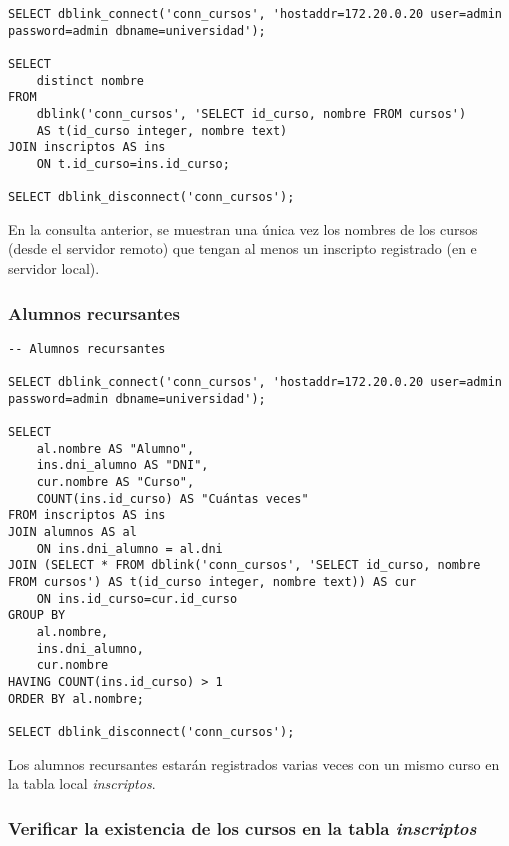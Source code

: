 \vspace*{5mm}
\begin{lstlisting}[title=Cursos con algún inscripto (el script es \emph{cursos\_con\_inscriptos.sql})]
SELECT dblink_connect('conn_cursos', 'hostaddr=172.20.0.20 user=admin password=admin dbname=universidad');

SELECT 
    distinct nombre 
FROM 
    dblink('conn_cursos', 'SELECT id_curso, nombre FROM cursos') 
    AS t(id_curso integer, nombre text)
JOIN inscriptos AS ins 
    ON t.id_curso=ins.id_curso;

SELECT dblink_disconnect('conn_cursos');
\end{lstlisting}

En la consulta anterior, se muestran una única vez los nombres de los cursos (desde el servidor remoto) que tengan al menos un inscripto registrado (en e servidor local).


\subsubsection{Alumnos recursantes}

\vspace*{5mm}
\begin{lstlisting}[title=Alumnos que cursaron más de una vez una materia (el script es \emph{recursantes.sql})]
-- Alumnos recursantes

SELECT dblink_connect('conn_cursos', 'hostaddr=172.20.0.20 user=admin password=admin dbname=universidad');

SELECT 
    al.nombre AS "Alumno",
    ins.dni_alumno AS "DNI", 
    cur.nombre AS "Curso",
    COUNT(ins.id_curso) AS "Cuántas veces" 
FROM inscriptos AS ins
JOIN alumnos AS al
    ON ins.dni_alumno = al.dni
JOIN (SELECT * FROM dblink('conn_cursos', 'SELECT id_curso, nombre FROM cursos') AS t(id_curso integer, nombre text)) AS cur
    ON ins.id_curso=cur.id_curso
GROUP BY 
    al.nombre,
    ins.dni_alumno,
    cur.nombre
HAVING COUNT(ins.id_curso) > 1 
ORDER BY al.nombre;

SELECT dblink_disconnect('conn_cursos');
\end{lstlisting}

Los alumnos recursantes estarán registrados varias veces con un mismo curso en la tabla local \emph{inscriptos}. 

\subsubsection{Verificar la existencia de los cursos en la tabla \emph{inscriptos}}

